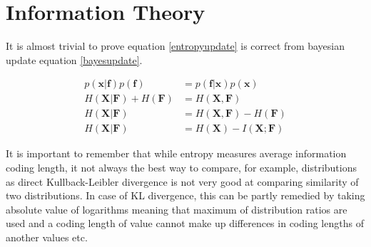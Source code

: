 \documentclass{article}
\begin{document}
\appendix
\section{Information Theory}

It is almost trivial to prove equation \ref{entropyupdate} is correct from bayesian update equation \ref{bayesupdate}.

\begin{equation*}
\begin{aligned}
p(\bm{x}|\bm{f})p(\bm{f}) &= p(\bm{f}|\bm{x})p(\bm{x})\\
H(\bm{X}|\bm{F})+H(\bm{F}) &= H(\bm{X},\bm{F}) \\
H(\bm{X}|\bm{F}) &= H(\bm{X},\bm{F}) - H(\bm{F}) \\
H(\bm{X}|\bm{F}) &= H(\bm{X}) - I(\bm{X};\bm{F})
\end{aligned}
\end{equation*}

It is important to remember that while entropy measures average  information coding length, it not always the best way to compare, for example, distributions as direct  Kullback-Leibler divergence is not very good at comparing similarity of two distributions. In case of KL divergence, this can be partly remedied by taking absolute value of logarithms meaning that maximum of distribution ratios are used and a coding length of value cannot make up differences in coding lengths of another values etc.
\end{document}
